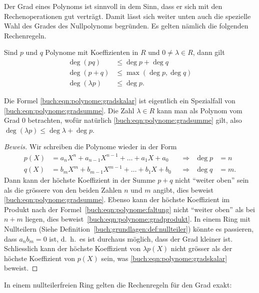 Der Grad eines Polynoms ist sinnvoll in dem Sinn, dass er sich mit
den Rechenoperationen gut verträgt.
Damit lässt sich weiter unten auch die spezielle Wahl des Grades
des Nullpolynoms begründen.
Es gelten nämlich die folgenden Rechenregeln.

\begin{lemma}
\label{lemma:rechenregelnfuerpolynomgrad}
Sind $p$ und $q$ Polynome mit Koeffizienten in $R$ und $0\ne \lambda\in R$,
dann gilt
\begin{align}
\deg(pq) &\le \deg p + \deg q
\label{buch:eqn:polynome:gradsumme}
\\
\deg(p+q) &\le \max(\deg p, \deg q)
\label{buch:eqn:polynome:gradprodukt}
\\
\deg(\lambda p) &\le \deg p.
\label{buch:eqn:polynome:gradskalar}
\end{align}
\end{lemma}

Die Formel \eqref{buch:eqn:polynome:gradskalar} ist eigentlich
ein Spezialfall von \eqref{buch:eqn:polynome:gradsumme}.
Die Zahl $\lambda\in R$ kann man als Polynom vom Grad $0$ betrachten,
wofür natürlich \eqref{buch:eqn:polynome:gradsumme} gilt, also
$\deg(\lambda p) \le \deg\lambda + \deg p$.

\begin{proof}[Beweis]
Wir schreiben die Polynome wieder in der Form
\[
\begin{aligned}
p(X) &= a_nX^n + a_{n-1}X^{n-1} + \dots + a_1X + a_0&&\Rightarrow&\deg p&=n\\
q(X) &= b_mX^m + b_{m-1}X^{m-1} + \dots + b_1X + b_0&&\Rightarrow&\deg q&=m.
\end{aligned}
\]
Dann kann der höchste Koeffizient in der Summe $p+q$ nicht ``weiter oben''
sein als die grössere von den beiden Zahlen $n$ und $m$ angibt, dies
beweist \eqref{buch:eqn:polynome:gradsumme}.
Ebenso kann der höchste Koeffizient im Produkt nach der
Formel~\eqref{buch:eqn:polynome:faltung} nicht ``weiter oben'' als bei
$n+m$ liegen, dies 
beweist~\eqref{buch:eqn:polynome:gradprodukt}.
In einem Ring mit Nullteilern
(Siehe Definition~\ref{buch:grundlagen:def:nullteiler})
könnte es passieren, dass $a_nb_m=0$ ist, d.~h.~es ist durchaus möglich,
dass der Grad kleiner ist.
Schliesslich kann der höchste Koeffizient von $\lambda p(X)$ nicht grösser
als der höchste Koeffizient von $p(X)$ sein, was
\eqref{buch:eqn:polynome:gradskalar} beweist.
\end{proof}

In einem nullteilerfreien Ring gelten die Rechenregeln für den Grad exakt:

